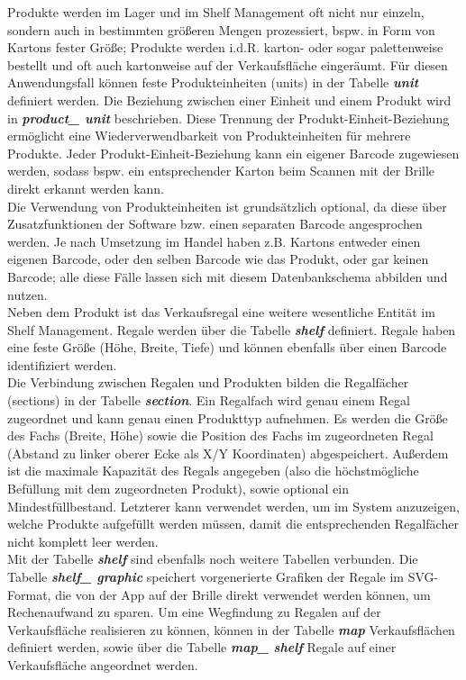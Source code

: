 Produkte werden im Lager und im Shelf Management oft nicht nur einzeln, sondern auch in bestimmten größeren Mengen prozessiert, bspw. in Form von Kartons fester Größe; Produkte werden i.d.R. karton- oder sogar palettenweise bestellt und oft auch kartonweise auf der Verkaufsfläche eingeräumt. Für diesen Anwendungsfall können feste Produkteinheiten (\glqq units\grqq ) in der Tabelle \textit{\textbf{unit}} definiert werden. Die Beziehung zwischen einer Einheit und einem Produkt wird in \textit{\textbf{product\_ unit}} beschrieben. Diese Trennung der Produkt-Einheit-Beziehung ermöglicht eine Wiederverwendbarkeit von Produkteinheiten für mehrere Produkte. Jeder Produkt-Einheit-Beziehung kann ein eigener Barcode zugewiesen werden, sodass bspw. ein entsprechender Karton beim Scannen mit der Brille direkt erkannt werden kann.\\

Die Verwendung von Produkteinheiten ist grundsätzlich optional, da diese über Zusatzfunktionen der Software bzw. einen separaten Barcode angesprochen werden. Je nach Umsetzung im Handel haben z.B. Kartons entweder einen eigenen Barcode, oder den selben Barcode wie das Produkt, oder gar keinen Barcode; alle diese Fälle lassen sich mit diesem Datenbankschema abbilden und nutzen.\\

Neben dem Produkt ist das Verkaufsregal eine weitere wesentliche Entität im Shelf Management. Regale werden über die Tabelle \textit{\textbf{shelf}} definiert. Regale haben eine feste Größe (Höhe, Breite, Tiefe) und können ebenfalls über einen Barcode identifiziert werden.\\

Die Verbindung zwischen Regalen und Produkten bilden die Regalfächer (\glqq sections\grqq ) in der Tabelle \textit{\textbf{section}}. Ein Regalfach wird genau einem Regal zugeordnet und kann genau einen Produkttyp aufnehmen. Es werden die Größe des Fachs (Breite, Höhe) sowie die Position des Fachs im zugeordneten Regal (Abstand zu linker oberer Ecke als X/Y Koordinaten) abgespeichert. Außerdem ist die maximale Kapazität des Regals angegeben (also die höchstmögliche Befüllung mit dem zugeordneten Produkt), sowie optional ein Mindestfüllbestand. Letzterer kann verwendet werden, um im System anzuzeigen, welche Produkte aufgefüllt werden müssen, damit die entsprechenden Regalfächer nicht komplett leer werden.\\

Mit der Tabelle  \textit{\textbf{shelf}} sind ebenfalls noch weitere Tabellen verbunden. Die Tabelle  \textit{\textbf{shelf\_ graphic}} speichert vorgenerierte Grafiken der Regale im \ac{SVG}-Format, die von der App auf der Brille direkt verwendet werden können, um Rechenaufwand zu sparen. Um eine Wegfindung zu Regalen auf der Verkaufsfläche realisieren zu können, können in der Tabelle \textit{\textbf{map}} Verkaufsflächen definiert werden, sowie über die Tabelle \textit{\textbf{map\_ shelf}} Regale auf einer Verkaufsfläche angeordnet werden.\\

